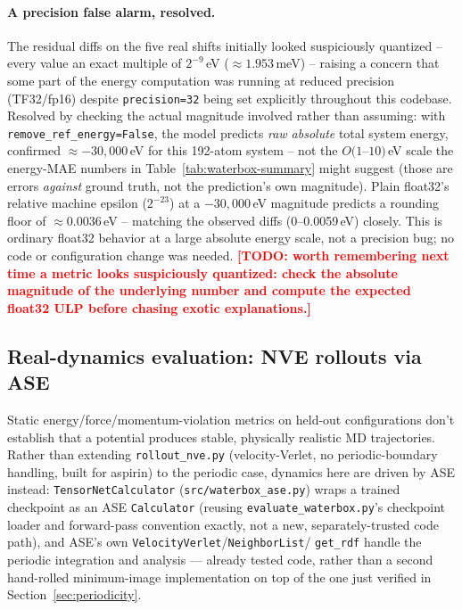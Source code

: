 \documentclass[11pt]{article}
\newcommand{\todo}[1]{\textcolor{red}{\textbf{[TODO: #1]}}}
\begin{document}
\paragraph{A precision false alarm, resolved.} The residual diffs on the
five real shifts initially looked suspiciously quantized -- every value an
exact multiple of $2^{-9}$\,eV ($\approx 1.953$\,meV) -- raising a concern
that some part of the energy computation was running at reduced precision
(TF32/fp16) despite \texttt{precision=32} being set explicitly throughout
this codebase. Resolved by checking the actual magnitude involved rather
than assuming: with \texttt{remove\_ref\_energy=False}, the model predicts
\emph{raw absolute} total system energy, confirmed $\approx -30{,}000$\,eV
for this 192-atom system -- not the $O(1$--$10)$\,eV scale the energy-MAE
numbers in Table~\ref{tab:waterbox-summary} might suggest (those are errors
\emph{against} ground truth, not the prediction's own magnitude). Plain
float32's relative machine epsilon ($2^{-23}$) at a $-30{,}000$\,eV magnitude
predicts a rounding floor of $\approx 0.0036$\,eV -- matching the observed
diffs (0--0.0059\,eV) closely. This is ordinary float32 behavior at a large
absolute energy scale, not a precision bug; no code or configuration change
was needed. \todo{worth remembering next time a metric looks suspiciously
quantized: check the absolute magnitude of the underlying number and compute
the expected float32 ULP before chasing exotic explanations.}

\subsection{Real-dynamics evaluation: NVE rollouts via ASE}
\label{sec:rollout-methods}

Static energy/force/momentum-violation metrics on held-out configurations
don't establish that a potential produces stable, physically realistic MD
trajectories. Rather than extending \texttt{rollout\_nve.py} (velocity-Verlet,
no periodic-boundary handling, built for aspirin) to the periodic case,
dynamics here are driven by ASE \cite{ase} instead: \texttt{TensorNetCalculator}
(\texttt{src/waterbox\_ase.py}) wraps a trained checkpoint as an ASE
\texttt{Calculator} (reusing \texttt{evaluate\_waterbox.py}'s checkpoint
loader and forward-pass convention exactly, not a new, separately-trusted
code path), and ASE's own \texttt{VelocityVerlet}/\texttt{NeighborList}/
\texttt{get\_rdf} handle the periodic integration and analysis --- already
tested code, rather than a second hand-rolled minimum-image implementation
on top of the one just verified in Section~\ref{sec:periodicity}.
\end{document}
